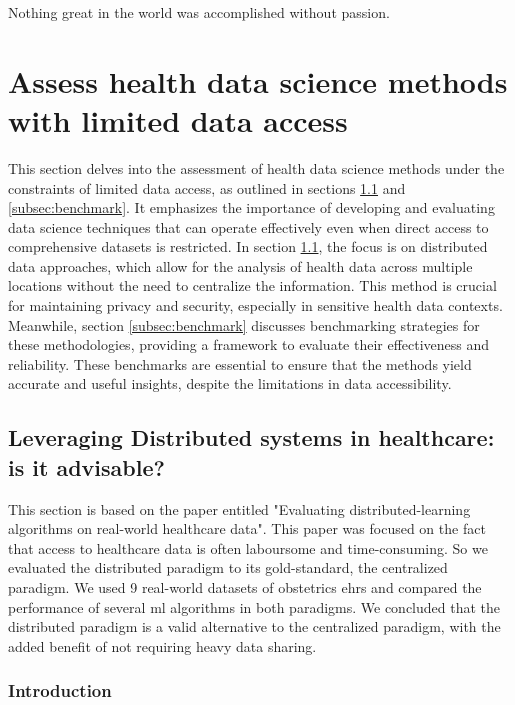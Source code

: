 \begin{savequote}[85mm]
Nothing great in the world was accomplished 
without passion.
\end{savequote}

\chapter{Assess health data science  methods with limited data access}\label{chap:goal2}
This section delves into the assessment of health data science methods under the constraints of limited data access, as outlined in sections \ref{subsec:distributed} and \ref{subsec:benchmark}. It emphasizes the importance of developing and evaluating data science techniques that can operate effectively even when direct access to comprehensive datasets is restricted. In section \ref{subsec:distributed}, the focus is on distributed data approaches, which allow for the analysis of health data across multiple locations without the need to centralize the information. This method is crucial for maintaining privacy and security, especially in sensitive health data contexts. Meanwhile, section \ref{subsec:benchmark} discusses benchmarking strategies for these methodologies, providing a framework to evaluate their effectiveness and reliability. These benchmarks are essential to ensure that the methods yield accurate and useful insights, despite the limitations in data accessibility.


\section{Leveraging Distributed systems in healthcare: is it advisable?}\label{subsec:distributed}
This section is based on the paper entitled "Evaluating distributed-learning algorithms on real-world healthcare data". This paper was focused on the fact that access to healthcare data is often laboursome and time-consuming. So we evaluated the distributed paradigm to its gold-standard, the centralized paradigm. We used 9 real-world datasets of obstetrics \acp{ehr} and compared the performance of several \ac{ml} algorithms in both paradigms. We concluded that the distributed paradigm is a valid alternative to the centralized paradigm, with the added benefit of not requiring heavy data sharing.

\subsection{Introduction}


